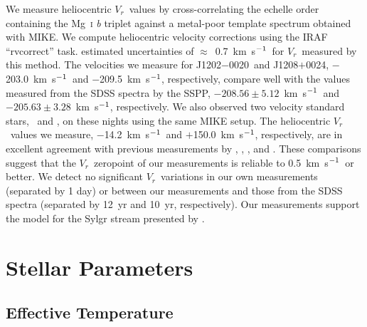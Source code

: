 \documentclass[twocolumn,tighten]{aastex62}
\newcommand{\hdeight}{\object[HD 84937]{HD~84937}}
\newcommand{\jtwo}{J1202$-$0020}
\newcommand{\jeight}{J1208$+$0024}
\newcommand{\kmsec}{\mbox{km~s$^{\rm -1}$}}
\newcommand{\rv}{$V_{r}$}
\begin{document}
We measure heliocentric \rv\ values by cross-correlating the
echelle order containing the Mg~\textsc{i} \textit{b} triplet 
against a metal-poor template spectrum obtained with MIKE.
We compute heliocentric velocity corrections using the 
IRAF ``rvcorrect'' task.
\citet{roederer14c} estimated uncertainties of $\approx$~0.7~\kmsec\
for \rv\ measured by this method.
The velocities we measure for \jtwo\ and \jeight, 
$-$203.0~\kmsec\ and $-$209.5~\kmsec, respectively,
compare well with the values measured from the SDSS spectra 
by the SSPP,
$-208.56 \pm 5.12$~\kmsec\ and
$-205.63 \pm 3.28$~\kmsec, respectively.
We also observed two velocity standard stars,
\hdeight\ and 
, on these nights using the same MIKE setup.
The heliocentric \rv\ values we measure,
$-$14.2~\kmsec\ and $+$150.0~\kmsec, respectively,
are in excellent agreement with previous measurements by
\citet{smith98}, \citet{ryan99}, \citet{carney01,carney03}, and
\citet{roederer14c}.
These comparisons suggest that the \rv\ zeropoint
of our measurements is reliable to 0.5~\kmsec\ or better.
We detect no significant \rv\ variations 
in our own measurements (separated by 1 day) or between our 
measurements and those from the SDSS spectra
(separated by 12~yr and 10~yr, respectively).
Our measurements support the model for the Sylgr stream
presented by .


\section{Stellar Parameters}
\label{params}


\subsection{Effective Temperature}
\label{temperature}
\end{document}

